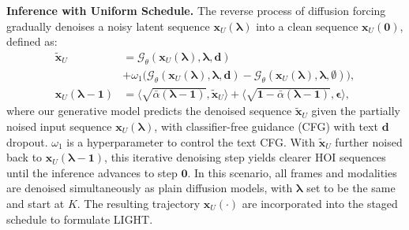\noindent \textbf{Inference with Uniform Schedule.} 
The reverse process of diffusion forcing gradually denoises a noisy latent sequence $\boldsymbol{x}_U(\boldsymbol{\lambda})$ into a clean sequence $\boldsymbol{x}_U (\boldsymbol0)$, defined as:
\begin{align}
\tilde{\boldsymbol{x}}_U &= \mathcal{G}_\theta(\boldsymbol{x}_U(\boldsymbol{\lambda}), \boldsymbol\lambda, \boldsymbol{d}) \nonumber \\ & + \omega_{1}\big(\mathcal{G}_\theta(\boldsymbol{x}_{U}(\boldsymbol\lambda), \boldsymbol\lambda,\boldsymbol{d})
-\mathcal{G}_\theta(\boldsymbol{x}_{U}(\boldsymbol\lambda), \boldsymbol\lambda,\emptyset)\big), \label{eq:textcfg}\\
\boldsymbol{x}_U(\boldsymbol{\lambda} - \boldsymbol{1}) &= \langle\sqrt{\bar{\alpha}(\boldsymbol\lambda - \boldsymbol{1})},\tilde{\boldsymbol{x}}_{U}\rangle + \langle\sqrt{ \boldsymbol{1} - \bar{\alpha}(\boldsymbol\lambda - \boldsymbol{1})},\boldsymbol{\epsilon}\rangle,
\label{eq:denoising_step}
\end{align}
where our generative model predicts the denoised sequence $\tilde{\boldsymbol{x}}_U$ given the partially noised input sequence $\boldsymbol{x}_U(\boldsymbol{\lambda})$, with classifier-free guidance (CFG) with text $\boldsymbol{d}$ dropout. $\omega_{1}$ is a hyperparameter to control the text CFG. With $\tilde{\boldsymbol{x}}_U$ further noised back to $\boldsymbol{x}_U(\boldsymbol{\lambda} - \boldsymbol{1})$, this iterative denoising step yields clearer HOI sequences until the inference advances to step $\boldsymbol{0}$. 
In this scenario, all frames and modalities are denoised simultaneously as plain diffusion models, with $\boldsymbol{\lambda}$ set to be the same and start at $K$. The resulting trajectory ${\boldsymbol{x}}_U(\cdot)$ are incorporated into the staged schedule to formulate LIGHT.

